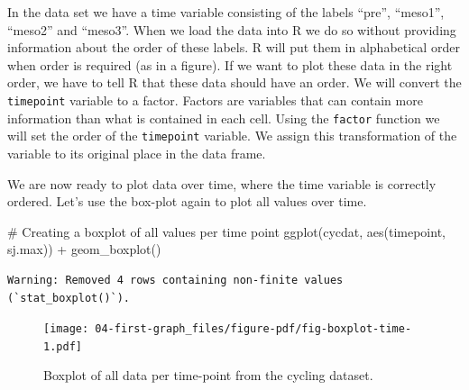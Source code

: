 \documentclass[
  11pt,
  letterpaper,
]{scrbook}
\newenvironment{Shaded}{\begin{snugshade}}{\end{snugshade}}
\newcommand{\AttributeTok}[1]{\textcolor[rgb]{0.40,0.45,0.13}{#1}}
\newcommand{\CommentTok}[1]{\textcolor[rgb]{0.37,0.37,0.37}{#1}}
\newcommand{\FunctionTok}[1]{\textcolor[rgb]{0.28,0.35,0.67}{#1}}
\newcommand{\NormalTok}[1]{\textcolor[rgb]{0.00,0.23,0.31}{#1}}
\newcommand{\OtherTok}[1]{\textcolor[rgb]{0.00,0.23,0.31}{#1}}
\newcommand{\SpecialCharTok}[1]{\textcolor[rgb]{0.37,0.37,0.37}{#1}}
\newcommand{\StringTok}[1]{\textcolor[rgb]{0.13,0.47,0.30}{#1}}
\begin{document}
In the data set we have a time variable consisting of the labels
``pre'', ``meso1'', ``meso2'' and ``meso3''. When we load the data into
R we do so without providing information about the order of these
labels. R will put them in alphabetical order when order is required (as
in a figure). If we want to plot these data in the right order, we have
to tell R that these data should have an order. We will convert the
\texttt{timepoint} variable to a factor. Factors are variables that can
contain more information than what is contained in each cell. Using the
\texttt{factor} function we will set the order of the \texttt{timepoint}
variable. We assign this transformation of the variable to its original
place in the data frame.

\begin{Shaded}
\end{Shaded}

We are now ready to plot data over time, where the time variable is
correctly ordered. Let's use the box-plot again to plot all values over
time.

\begin{Shaded}
\begin{Highlighting}[numbers=left,,]
\CommentTok{\# Creating a boxplot of all values per time point}
\FunctionTok{ggplot}\NormalTok{(cycdat, }\FunctionTok{aes}\NormalTok{(timepoint, sj.max)) }\SpecialCharTok{+} \FunctionTok{geom\_boxplot}\NormalTok{()}
\end{Highlighting}
\end{Shaded}

\begin{verbatim}
Warning: Removed 4 rows containing non-finite values (`stat_boxplot()`).
\end{verbatim}

\begin{figure}[H]

{\centering \texttt{[image: 04-first-graph\_files/figure-pdf/fig-boxplot-time-1.pdf]}

}

\caption{\label{fig-boxplot-time}Boxplot of all data per time-point from
the cycling dataset.}

\end{figure}
\end{document}
